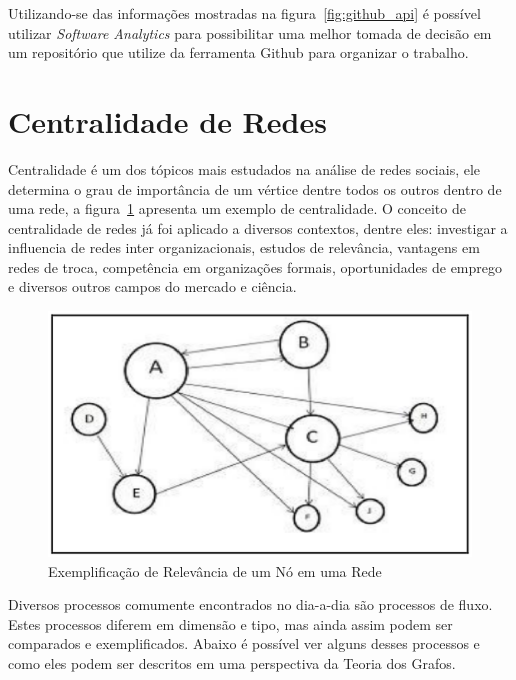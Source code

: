 Utilizando-se das informações mostradas na figura~\ref{fig:github_api} é possível utilizar
\textit{Software Analytics} para possibilitar uma melhor tomada de decisão em um
repositório que utilize da ferramenta Github para organizar o trabalho.

\section{Centralidade de Redes}
\label{ref:cen}
Centralidade é um dos tópicos mais estudados na análise de redes sociais, ele 
determina o grau de importância de um vértice dentre todos os outros dentro de uma 
rede, a figura~\ref{fig:centrality} apresenta um exemplo de centralidade. 
O conceito de centralidade de redes já foi aplicado a diversos contextos, dentre eles: investigar a influencia 
de redes inter organizacionais, estudos de relevância, vantagens em redes de troca, 
competência em organizações formais, oportunidades de emprego e diversos outros campos 
do mercado e ciência\cite{centrality}.

\begin{figure}[h]
    \centering
        \includegraphics[keepaspectratio=true,scale=0.5]{figuras/centrality.eps}
    \caption{Exemplificação de Relevância de um Nó em uma Rede}
    \label{fig:centrality}
\end{figure}

Diversos processos comumente encontrados no dia-a-dia são processos de fluxo. Estes
processos diferem em dimensão e tipo, mas ainda assim podem ser comparados e exemplificados.
Abaixo é possível ver alguns desses processos e como eles podem ser descritos em uma perspectiva
da Teoria dos Grafos\cite{ceflow}.  

